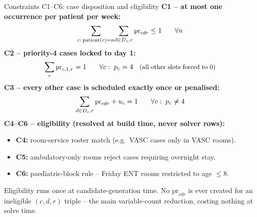 \documentclass[10pt,aspectratio=169]{beamer}
\begin{document}
\begin{frame}{Constraints C1--C6: case disposition and eligibility}
  \textbf{C1 -- at most one occurrence per patient per week:}
  \[\small
    \sum_{c:\,\text{patient}(c)=n}\!\sum_{d\in D_c,r}\text{pr}_{cdr}\le1
    \qquad\forall n
  \]
  \textbf{C2 -- priority-4 cases locked to day 1:}
  \[\small
    \sum_r\text{pr}_{c,1,r}=1
    \qquad\forall c:\;p_c=4
    \quad\text{(all other slots forced to 0)}
  \]
  \textbf{C3 -- every other case is scheduled exactly once or penalised:}
  \[\small
    \sum_{d\in D_c,r}\text{pr}_{cdr}+u_c=1
    \qquad\forall c:\;p_c\ne4
  \]
  \textbf{C4--C6 -- eligibility (resolved at build time, never solver rows):}
  \begin{itemize}\footnotesize
    \item \textbf{C4:} room-service roster match (e.g.\ VASC cases only in VASC rooms).
    \item \textbf{C5:} ambulatory-only rooms reject cases requiring overnight stay.
    \item \textbf{C6:} paediatric-block rule -- Friday ENT rooms restricted to age $\le8$.
  \end{itemize}
  \footnotesize Eligibility runs once at candidate-generation time. No
  $\text{pr}_{cdr}$ is ever created for an ineligible $(c,d,r)$ triple --
  the main variable-count reduction, costing nothing at solve time.
\end{frame}
\end{document}
